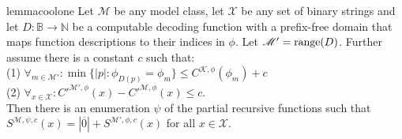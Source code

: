 \documentclass{style/llncs}
\newcommand{\M}{\mathscr M}
\newcommand{\K}{\mathscr K}
\newcommand{\X}{\mathscr X}
\newcommand{\B}{\mathbb B}
\newcommand{\N}{\mathbb N}
\newcommand{\tn}[1]{\textnormal{#1}}
\newcommand{\br}[1]{\overline{#1}}
\begin{document}
\begin{restatable}{lemma}{coolone}
\label{lemma:thecoolone}
  Let $\M$ be any model class, let $\X$ be any set of binary strings and let $D:\B\to\N$ be a computable decoding function with a prefix-free domain that maps function descriptions to their indices in $\phi$. Let $\M'= \tn{range}(D)$. Further assume there is a constant $c$ such that:\\
\-\hspace{1cm}(1) $\forall_{m\in\M'}:\min\{|p|:\phi_{D(p)}=\phi_m\}\le C^{\K,\phi}(\phi_m)+c$\\
\-\hspace{1cm}(2) $\forall_{x\in\X}:C'^{\M',\phi}(x)-C'^{\M,\phi}(x)\le c$.\\
Then there is an enumeration $\psi$ of the partial recursive functions such that $S^{\M,\psi,c}(x) = |\br{0}|+S^{\M',\phi,c}(x)$ for all $x\in\X$.
\end{restatable}
\end{document}
